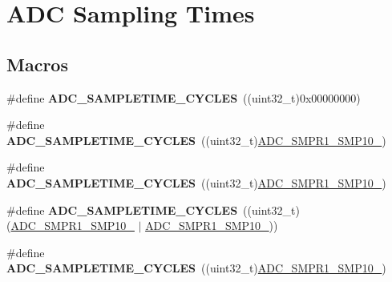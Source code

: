 \hypertarget{group___a_d_c__sampling__times}{}\section{A\+DC Sampling Times}
\label{group___a_d_c__sampling__times}
\subsection*{Macros}
\begin{DoxyCompactItemize}
\item 
\#define {\bfseries A\+D\+C\+\_\+\+S\+A\+M\+P\+L\+E\+T\+I\+M\+E\+\_\+C\+Y\+C\+L\+ES}~((uint32\+\_\+t)0x00000000)\hypertarget{group___a_d_c__sampling__times_gadd2dd58764750d84b32e7c814190953e}{}\label{group___a_d_c__sampling__times_gadd2dd58764750d84b32e7c814190953e}

\item 
\#define {\bfseries A\+D\+C\+\_\+\+S\+A\+M\+P\+L\+E\+T\+I\+M\+E\+\_\+C\+Y\+C\+L\+ES}~((uint32\+\_\+t)\hyperlink{group___peripheral___registers___bits___definition_ga8a8996c53042759f01e966fb00351ebf}{A\+D\+C\+\_\+\+S\+M\+P\+R1\+\_\+\+S\+M\+P10\+\_})\hypertarget{group___a_d_c__sampling__times_gabaea44ba33b9b0ff9b25c9a5f7b76a5b}{}\label{group___a_d_c__sampling__times_gabaea44ba33b9b0ff9b25c9a5f7b76a5b}

\item 
\#define {\bfseries A\+D\+C\+\_\+\+S\+A\+M\+P\+L\+E\+T\+I\+M\+E\+\_\+C\+Y\+C\+L\+ES}~((uint32\+\_\+t)\hyperlink{group___peripheral___registers___bits___definition_ga42b96f058436c8bdcfabe1e08c7edd61}{A\+D\+C\+\_\+\+S\+M\+P\+R1\+\_\+\+S\+M\+P10\+\_})\hypertarget{group___a_d_c__sampling__times_ga02196395d86a06b6373292f91cf8a62c}{}\label{group___a_d_c__sampling__times_ga02196395d86a06b6373292f91cf8a62c}

\item 
\#define {\bfseries A\+D\+C\+\_\+\+S\+A\+M\+P\+L\+E\+T\+I\+M\+E\+\_\+C\+Y\+C\+L\+ES}~((uint32\+\_\+t)(\hyperlink{group___peripheral___registers___bits___definition_ga42b96f058436c8bdcfabe1e08c7edd61}{A\+D\+C\+\_\+\+S\+M\+P\+R1\+\_\+\+S\+M\+P10\+\_} $\vert$ \hyperlink{group___peripheral___registers___bits___definition_ga8a8996c53042759f01e966fb00351ebf}{A\+D\+C\+\_\+\+S\+M\+P\+R1\+\_\+\+S\+M\+P10\+\_}))\hypertarget{group___a_d_c__sampling__times_ga7a65819ad4542d680ddac1d5eebfe415}{}\label{group___a_d_c__sampling__times_ga7a65819ad4542d680ddac1d5eebfe415}

\item 
\#define {\bfseries A\+D\+C\+\_\+\+S\+A\+M\+P\+L\+E\+T\+I\+M\+E\+\_\+C\+Y\+C\+L\+ES}~((uint32\+\_\+t)\hyperlink{group___peripheral___registers___bits___definition_ga289d89b4d92d7f685a8e44aeb9ddcded}{A\+D\+C\+\_\+\+S\+M\+P\+R1\+\_\+\+S\+M\+P10\+\_})\hypertarget{group___a_d_c__sampling__times_ga622a2822eeea3effd4360f1f975dc2f3}{}\label{group___a_d_c__sampling__times_ga622a2822eeea3effd4360f1f975dc2f3}


\end{DoxyCompactItemize}
